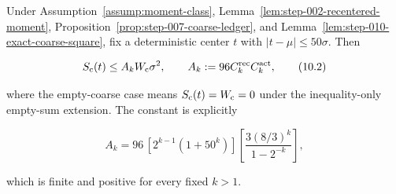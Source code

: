 \begin{proposition}\label{prop:step-010-coarse-moment-closure}
Under Assumption~\ref{assump:moment-class}, Lemma~\ref{lem:step-002-recentered-moment}, Proposition~\ref{prop:step-007-coarse-ledger}, and
Lemma~\ref{lem:step-010-exact-coarse-square}, fix a deterministic center
\(t\) with \(|t-\mu|\leq50\sigma\). Then

\[
S_{\rm c}(t)\leq A_kW_{\rm c}\sigma^2,
\qquad
A_k:=96C_k^{\rm rec}C_k^{\rm act},
\tag{10.2}
\]

where the empty-coarse case means \(S_{\rm c}(t)=W_{\rm c}=0\) under the
inequality-only empty-sum extension. The constant is explicitly

\[
A_k
=96\,[2^{k-1}(1+50^k)]
  \left[\frac{3(8/3)^k}{1-2^{-k}}\right],
\]

which is finite and positive for every fixed \(k>1\).
\end{proposition}

